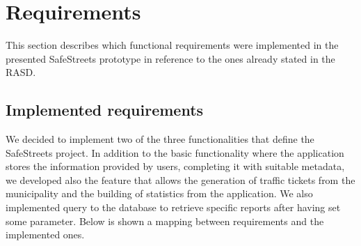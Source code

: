 \documentclass[../ITD.tex]{subfiles}
\begin{document}
    \chapter{Requirements}\label{ch:requirements}
    This section describes which functional requirements were implemented in the presented SafeStreets prototype in reference to the ones already stated in the RASD.
    \section{Implemented requirements}\label{sec:implemented-requirements}
    We decided to implement two of the three functionalities that define the SafeStreets project.
    In addition to the basic functionality where the application stores the information provided by users,
    completing it with suitable metadata, we developed also the feature that allows the generation of traffic
    tickets from the municipality and the building of statistics from the application.
    We also implemented query to the database to retrieve specific reports after having set some parameter.
    \newline Below is shown a mapping between requirements and the implemented ones.
\end{document}
